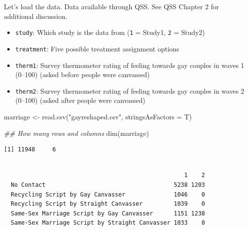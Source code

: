 \documentclass[
  letterpaper,
  DIV=11,
  numbers=noendperiod]{scrreprt}
\newenvironment{Shaded}{\begin{snugshade}}{\end{snugshade}}
\newcommand{\AttributeTok}[1]{\textcolor[rgb]{0.40,0.45,0.13}{#1}}
\newcommand{\DocumentationTok}[1]{\textcolor[rgb]{0.37,0.37,0.37}{\textit{#1}}}
\newcommand{\FunctionTok}[1]{\textcolor[rgb]{0.28,0.35,0.67}{#1}}
\newcommand{\NormalTok}[1]{\textcolor[rgb]{0.00,0.23,0.31}{#1}}
\newcommand{\OtherTok}[1]{\textcolor[rgb]{0.00,0.23,0.31}{#1}}
\newcommand{\SpecialCharTok}[1]{\textcolor[rgb]{0.37,0.37,0.37}{#1}}
\newcommand{\StringTok}[1]{\textcolor[rgb]{0.13,0.47,0.30}{#1}}
\providecommand{\tightlist}{%
  \setlength{\itemsep}{0pt}\setlength{\parskip}{0pt}}\usepackage{longtable,booktabs,array}
\begin{document}
Let's load the data. Data available through QSS. See QSS Chapter 2 for
additional discussion.

\begin{itemize}
\tightlist
\item
  \texttt{study}: Which study is the data from (\texttt{1} = Study1,
  \texttt{2} = Study2)
\item
  \texttt{treatment}: Five possible treatment assignment options
\item
  \texttt{therm1}: Survey thermometer rating of feeling towards gay
  couples in waves 1 (0--100) (asked before people were canvassed)
\item
  \texttt{therm2}: Survey thermometer rating of feeling towards gay
  couples in waves 2 (0--100) (asked after people were canvassed)
\end{itemize}

\begin{Shaded}
\begin{Highlighting}[]
\NormalTok{marriage }\OtherTok{\textless{}{-}} \FunctionTok{read.csv}\NormalTok{(}\StringTok{"gayreshaped.csv"}\NormalTok{, }\AttributeTok{stringsAsFactors =}\NormalTok{ T)}
\end{Highlighting}
\end{Shaded}

\begin{Shaded}
\begin{Highlighting}[]
\DocumentationTok{\#\# How many rows and columns}
\FunctionTok{dim}\NormalTok{(marriage)}
\end{Highlighting}
\end{Shaded}

\begin{verbatim}
[1] 11948     6
\end{verbatim}

\begin{Shaded}
\end{Shaded}

\begin{verbatim}
                                                
                                                    1    2
  No Contact                                     5238 1203
  Recycling Script by Gay Canvasser              1046    0
  Recycling Script by Straight Canvasser         1039    0
  Same-Sex Marriage Script by Gay Canvasser      1151 1238
  Same-Sex Marriage Script by Straight Canvasser 1033    0
\end{verbatim}
\end{document}
